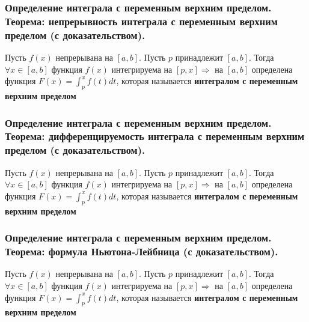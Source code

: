 \documentclass[10pt]{article}
\begin{document}
    \subsubsection{Определение интеграла с переменным верхним пределом. Теорема: непрерывность интеграла с переменным верхним пределом (с доказательством).}
    \begin{definition}
        Пусть $f(x)$ непрерывана на $[a, b]$. Пусть $p$ принадлежит $[a, b]$. Тогда $\forall x \in [a, b]$ функция $f(x)$ интегрируема на $[p, x] \Rightarrow$ на $[a, b]$ определена функция $F(x)=\int_p^x f(t) dt$, которая называется \textbf{интегралом с переменным верхним пределом}
    \end{definition}
    \begin{theorem}
        
    \end{theorem}



    \subsubsection{Определение интеграла с переменным верхним пределом. Теорема: дифференцируемость интеграла с переменным верхним пределом (с доказательством).}
    \begin{definition}
        Пусть $f(x)$ непрерывана на $[a, b]$. Пусть $p$ принадлежит $[a, b]$. Тогда $\forall x \in [a, b]$ функция $f(x)$ интегрируема на $[p, x] \Rightarrow$ на $[a, b]$ определена функция $F(x)=\int_p^x f(t) dt$, которая называется \textbf{интегралом с переменным верхним пределом}
    \end{definition}
    


    \subsubsection{Определение интеграла с переменным верхним пределом. Теорема: формула Ньютона-Лейбница (с доказательством).}
    \begin{definition}
        Пусть $f(x)$ непрерывана на $[a, b]$. Пусть $p$ принадлежит $[a, b]$. Тогда $\forall x \in [a, b]$ функция $f(x)$ интегрируема на $[p, x] \Rightarrow$ на $[a, b]$ определена функция $F(x)=\int_p^x f(t) dt$, которая называется \textbf{интегралом с переменным верхним пределом}
    \end{definition}
\end{document}
